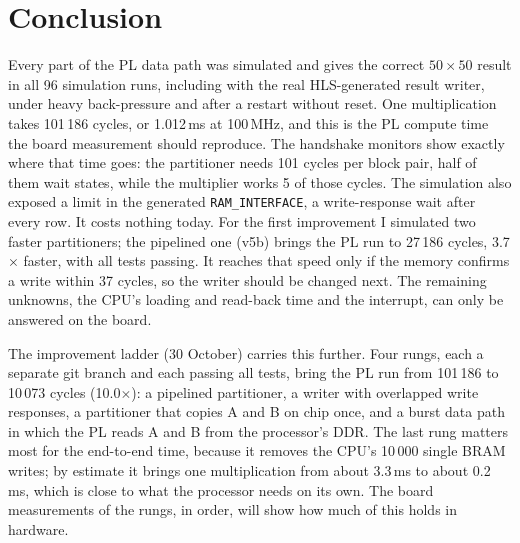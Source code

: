 \documentclass[11pt,a4paper]{article}
\newcommand{\code}[1]{\texttt{#1}}
\begin{document}
\section{Conclusion}
Every part of the PL data path was simulated and gives the correct $50\times50$ result in all 96 simulation runs, including with the real HLS-generated result writer, under heavy back-pressure and after a restart without reset. One multiplication takes 101\,186 cycles, or 1.012\,ms at 100\,MHz, and this is the PL compute time the board measurement should reproduce. The handshake monitors show exactly where that time goes: the partitioner needs 101 cycles per block pair, half of them wait states, while the multiplier works 5 of those cycles. The simulation also exposed a limit in the generated \code{RAM\_INTERFACE}, a write-response wait after every row. It costs nothing today. For the first improvement I simulated two faster partitioners; the pipelined one (v5b) brings the PL run to 27\,186 cycles, 3.7$\times$ faster, with all tests passing. It reaches that speed only if the memory confirms a write within 37 cycles, so the writer should be changed next. The remaining unknowns, the CPU's loading and read-back time and the interrupt, can only be answered on the board.

The improvement ladder (30 October) carries this further. Four rungs, each a separate git branch and each passing all tests, bring the PL run from 101\,186 to 10\,073 cycles (10.0$\times$): a pipelined partitioner, a writer with overlapped write responses, a partitioner that copies A and B on chip once, and a burst data path in which the PL reads A and B from the processor's DDR. The last rung matters most for the end-to-end time, because it removes the CPU's 10\,000 single BRAM writes; by estimate it brings one multiplication from about 3.3\,ms to about 0.2\,ms, which is close to what the processor needs on its own. The board measurements of the rungs, in order, will show how much of this holds in hardware.

\appendix
\end{document}
